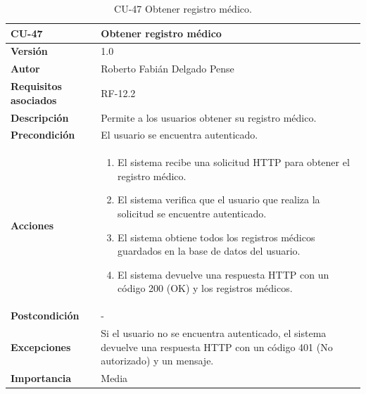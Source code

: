\begin{table}[p]
	\centering
	\begin{tabularx}{\linewidth}{ p{} p{} }
		\toprule
		\textbf{CU-47}    & \textbf{Obtener registro médico}\\
		\toprule
		\textbf{Versión}              & 1.0    \\
		\textbf{Autor}                & Roberto Fabián Delgado Pense \\
		\textbf{Requisitos asociados} & RF-12.2 \\ 
		\textbf{Descripción}          & Permite a los usuarios obtener su registro médico. \\
		\textbf{Precondición}         & El usuario se encuentra autenticado. \\  
		\textbf{Acciones}             &
		\begin{enumerate}
			\def\labelenumi{\arabic{enumi}.}
			\tightlist
			\item El sistema recibe una solicitud HTTP para obtener el registro médico.
                \item El sistema verifica que el usuario que realiza la solicitud se encuentre autenticado.
			\item El sistema obtiene todos los registros médicos guardados en la base de datos del usuario.
                \item El sistema devuelve una respuesta HTTP con un código 200 (OK) y los registros médicos.         
            \end{enumerate}\\
		\textbf{Postcondición}        & -  \\
		\textbf{Excepciones}          &  Si el usuario no se encuentra autenticado, el 
                    sistema devuelve una respuesta HTTP con un código 401 (No autorizado) y un mensaje.\\
		\textbf{Importancia}          & Media \\
		\bottomrule
	\end{tabularx}
	\caption{CU-47 Obtener registro médico.}
\end{table}

